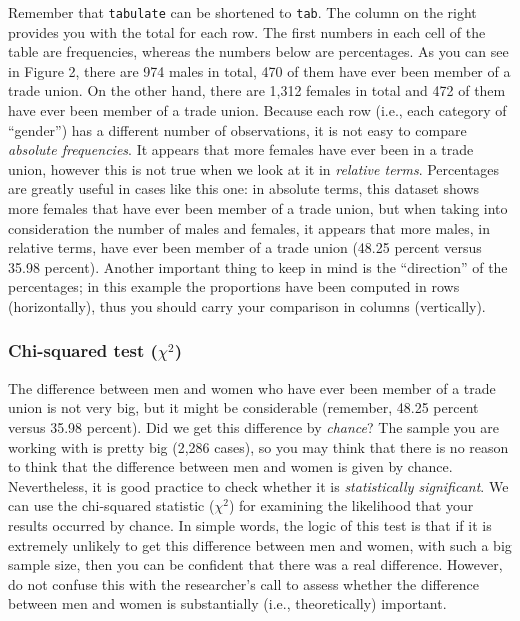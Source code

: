 \documentclass{article}
\begin{document}
Remember that \texttt{tabulate} can be shortened to \texttt{tab}. The column on the right provides you with the total for each row. The first numbers in each cell of the table are frequencies, whereas the numbers below are percentages. As you can see in Figure 2, there are 974 males in total, 470 of them have ever been member of a trade union. On the other hand, there are 1,312 females in total and 472 of them have ever been member of a trade union. Because each row (i.e., each category of ``gender'') has a different number of observations, it is not easy to compare \textit{absolute frequencies}. It appears that more females have ever been in a trade union, however this is not true when we look at it in \textit{relative terms}. Percentages are greatly useful in cases like this one: in absolute terms, this dataset shows more females that have ever been member of a trade union, but when taking into consideration the number of males and females, it appears that more males, in relative terms, have ever been member of a trade union (48.25 percent versus 35.98 percent). Another important thing to keep in mind is the ``direction'' of the percentages; in this example the proportions have been computed in rows (horizontally), thus you should carry your comparison in columns (vertically).

\subsubsection*{Chi-squared test ($\chi^2$)}

The difference between men and women who have ever been member of a trade union is not very big, but it might be considerable (remember, 48.25 percent versus 35.98 percent). Did we get this difference by \textit{chance}? The sample you are working with is pretty big (2,286 cases), so you may think that there is no reason to think that the difference between men and women is given by chance. Nevertheless, it is good practice to check whether it is \textit{statistically significant}. We can use the chi-squared statistic ($\chi^2$) for examining the likelihood that your results occurred by chance. In simple words, the logic of this test is that if it is extremely unlikely to get this difference between men and women, with such a big sample size, then you can be confident that there was a real difference. However, do not confuse this with the researcher's call to assess whether the difference between men and women is substantially (i.e., theoretically) important.
\end{document}
